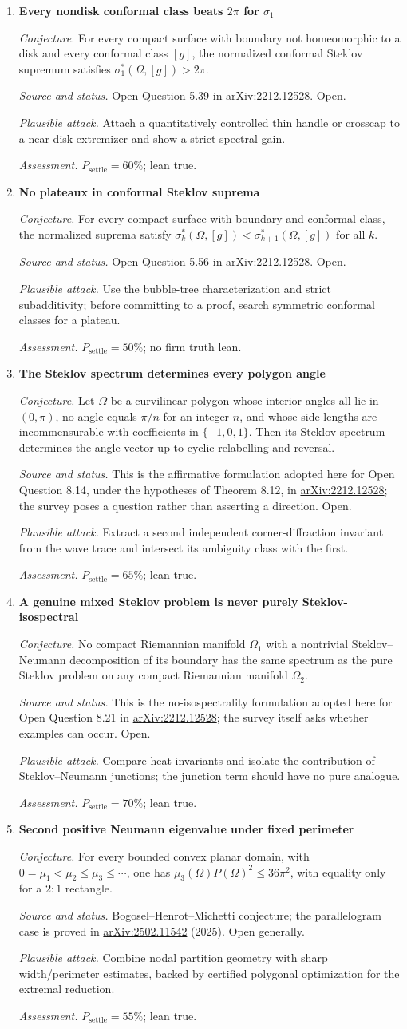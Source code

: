 \documentclass[11pt]{article}
\newcommand{\cand}[5]{%
  \item \textbf{#1}\par
  \emph{Conjecture.} #2\par
  \emph{Source and status.} #3\par
  \emph{Plausible attack.} #4\par
  \emph{Assessment.} #5
}
\newcommand{\psettle}{P_{\mathrm{settle}}}
\begin{document}
\begin{enumerate}[label=\textbf{M\arabic*.}]
\cand{Every nondisk conformal class beats $2\pi$ for $\sigma_1$}
{For every compact surface with boundary not homeomorphic to a disk and every conformal class $[g]$, the normalized conformal Steklov supremum satisfies $\sigma_1^*(\Omega,[g])>2\pi$.}
{Open Question 5.39 in \href{https://arxiv.org/abs/2212.12528}{arXiv:2212.12528}.  Open.}
{Attach a quantitatively controlled thin handle or crosscap to a near-disk extremizer and show a strict spectral gain.}
{$\psettle=60\%$; lean true.}

\cand{No plateaux in conformal Steklov suprema}
{For every compact surface with boundary and conformal class, the normalized suprema satisfy $\sigma_k^*(\Omega,[g])<\sigma_{k+1}^*(\Omega,[g])$ for all $k$.}
{Open Question 5.56 in \href{https://arxiv.org/abs/2212.12528}{arXiv:2212.12528}.  Open.}
{Use the bubble-tree characterization and strict subadditivity; before committing to a proof, search symmetric conformal classes for a plateau.}
{$\psettle=50\%$; no firm truth lean.}

\cand{The Steklov spectrum determines every polygon angle}
{Let $\Omega$ be a curvilinear polygon whose interior angles all lie in $(0,\pi)$, no angle equals $\pi/n$ for an integer $n$, and whose side lengths are incommensurable with coefficients in $\{-1,0,1\}$.  Then its Steklov spectrum determines the angle vector up to cyclic relabelling and reversal.}
{This is the affirmative formulation adopted here for Open Question 8.14, under the hypotheses of Theorem 8.12, in \href{https://arxiv.org/abs/2212.12528}{arXiv:2212.12528}; the survey poses a question rather than asserting a direction.  Open.}
{Extract a second independent corner-diffraction invariant from the wave trace and intersect its ambiguity class with the first.}
{$\psettle=65\%$; lean true.}

\cand{A genuine mixed Steklov problem is never purely Steklov-isospectral}
{No compact Riemannian manifold $\Omega_1$ with a nontrivial Steklov--Neumann decomposition of its boundary has the same spectrum as the pure Steklov problem on any compact Riemannian manifold $\Omega_2$.}
{This is the no-isospectrality formulation adopted here for Open Question 8.21 in \href{https://arxiv.org/abs/2212.12528}{arXiv:2212.12528}; the survey itself asks whether examples can occur.  Open.}
{Compare heat invariants and isolate the contribution of Steklov--Neumann junctions; the junction term should have no pure analogue.}
{$\psettle=70\%$; lean true.}

\cand{Second positive Neumann eigenvalue under fixed perimeter}
{For every bounded convex planar domain, with $0=\mu_1<\mu_2\le\mu_3\le\cdots$, one has $\mu_3(\Omega)P(\Omega)^2\le36\pi^2$, with equality only for a $2{:}1$ rectangle.}
{Bogosel--Henrot--Michetti conjecture; the parallelogram case is proved in \href{https://arxiv.org/abs/2502.11542}{arXiv:2502.11542} (2025).  Open generally.}
{Combine nodal partition geometry with sharp width/perimeter estimates, backed by certified polygonal optimization for the extremal reduction.}
{$\psettle=55\%$; lean true.}


\end{enumerate}
\end{document}
